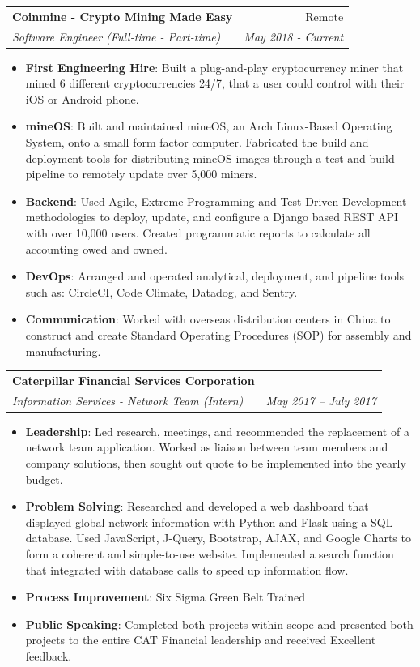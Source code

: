 \documentclass[a4paper,20pt]{article}
\makeatletter
\newcommand{\resumeItem}[2]{
  \item\small{
    \textbf{#1}{: #2 \vspace{-2pt}}
  }
}
\newcommand{\resumeSubheading}[4]{
  \vspace{-1pt}\item
    \begin{tabular*}{0.97\textwidth}{l@{\extracolsep{\fill}}r}
      \textbf{#1} & #2 \\
      \textit{#3} & \textit{#4} \\
    \end{tabular*}\vspace{-5pt}
}
\newcommand{\resumeItemListStart}{\begin{itemize}}
\newcommand{\resumeItemListEnd}{\end{itemize}\vspace{-5pt}}
\makeatother
\begin{document}
    \resumeSubheading
		{Coinmine - Crypto Mining Made Easy}{Remote}
		{Software Engineer (Full-time - Part-time)}{May 2018 - Current}
		\resumeItemListStart
        \resumeItem{First Engineering Hire}
        {Built a plug-and-play cryptocurrency miner that mined 6 different cryptocurrencies 24/7, that a user could control with their iOS or Android phone.}
        \resumeItem{mineOS}
        {Built and maintained mineOS, an Arch Linux-Based Operating System, onto a small form factor computer. Fabricated the build and deployment tools for distributing mineOS images through a test and build pipeline to remotely update over 5,000 miners.}
        \resumeItem{Backend}
        {Used Agile, Extreme Programming and Test Driven Development methodologies to deploy, update, and configure a Django based REST API with over 10,000 users. Created programmatic reports to calculate all accounting owed and owned.}
        \resumeItem{DevOps}
        {Arranged and operated analytical, deployment, and pipeline tools such as: CircleCI, Code Climate, Datadog, and Sentry.}
        \resumeItem{Communication}
        {Worked with overseas distribution centers in China to construct and create Standard Operating Procedures (SOP) for assembly and manufacturing.}
		\resumeItemListEnd
\vspace{-3pt}

    \resumeSubheading
		{Caterpillar Financial Services Corporation}{}
		{Information Services - Network Team (Intern)}{May 2017 – July 2017}
		\resumeItemListStart
        \resumeItem{Leadership}
        {Led research, meetings, and recommended the replacement of a network team application. Worked as liaison between team members and company solutions, then sought out quote to be implemented into the yearly budget.}
        \resumeItem{Problem Solving}
        {Researched and developed a web dashboard that displayed global network information with Python and Flask using a SQL database. Used JavaScript, J-Query, Bootstrap, AJAX, and Google Charts to form a coherent and simple-to-use website. Implemented a search function that integrated with database calls to speed up information flow.}
         \resumeItem{Process Improvement}{Six Sigma Green Belt Trained}
	\resumeItem{Public Speaking}{Completed both projects within scope and presented both projects to the entire CAT Financial leadership and received Excellent feedback.}
		\resumeItemListEnd
\vspace{-3pt}
\end{document}
